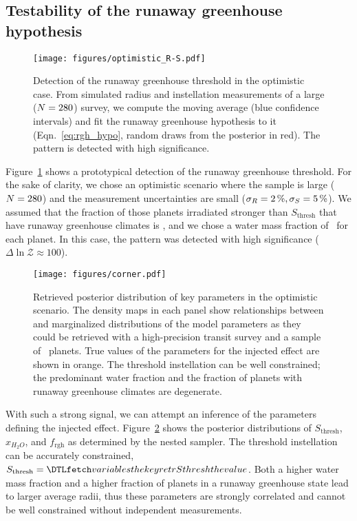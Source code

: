 \documentclass[modern]{aastex631}
\begin{document}
\subsection{Testability of the runaway greenhouse hypothesis}
\begin{figure}[ht!]
    \begin{centering}
        \texttt{[image: figures/optimistic\_R-S.pdf]}
        \caption{
        Detection of the runaway greenhouse threshold in the optimistic case.
        From simulated radius and instellation measurements of a large ($N = 280$) survey, we compute the moving average (blue confidence intervals) and fit the runaway greenhouse hypothesis to it (Eqn.~\ref{eq:rgh_hypo}, random draws from the posterior in red).
            The pattern is detected with high significance.
        }
        \label{fig:optimistic_R-S}
    \end{centering}
\end{figure}
Figure~\ref{fig:optimistic_R-S} shows a prototypical detection of the runaway greenhouse threshold.
For the sake of clarity, we chose an optimistic scenario where the sample is large ($N = 280$) and the measurement uncertainties are small ($\sigma_{R} = \SI{2}{\percent}, \sigma_{S} = \SI{5}{\percent}$).
We assumed that the fraction of those planets irradiated stronger than $S_\mathrm{thresh}$ that have runaway greenhouse climates is \frgh, and we chose a water mass fraction of \wrr\ for each planet.
In this case, the pattern was detected with high significance ($\Delta \ln \mathcal{Z} \approx 100$).


\begin{figure}[ht!]
    \begin{centering}
        \texttt{[image: figures/corner.pdf]}
        \caption{
            Retrieved posterior distribution of key parameters in the optimistic scenario. The density maps in each panel show relationships between and marginalized distributions of the model parameters as they could be retrieved with a high-precision transit survey and a sample of \Nplanets\ planets. True values of the parameters for the injected effect are shown in orange. The threshold instellation can be well constrained; the predominant water fraction and the fraction of planets with runaway greenhouse climates are degenerate.
        }
        \label{fig:cornerplot}
    \end{centering}
\end{figure}
With such a strong signal, we can attempt an inference of the parameters defining the injected effect.
Figure~\ref{fig:cornerplot} shows the posterior distributions of $S_\mathrm{thresh}$, $x_{H_2O}$, and $f_\mathrm{rgh}$ as determined by the nested sampler.
The threshold instellation can be accurately constrained, $S_\mathrm{thresh} = \var{retrSthresh}$.
Both a higher water mass fraction and a higher fraction of planets in a runaway greenhouse state lead to larger average radii, thus these parameters are strongly correlated and cannot be well constrained without independent measurements.
\end{document}
